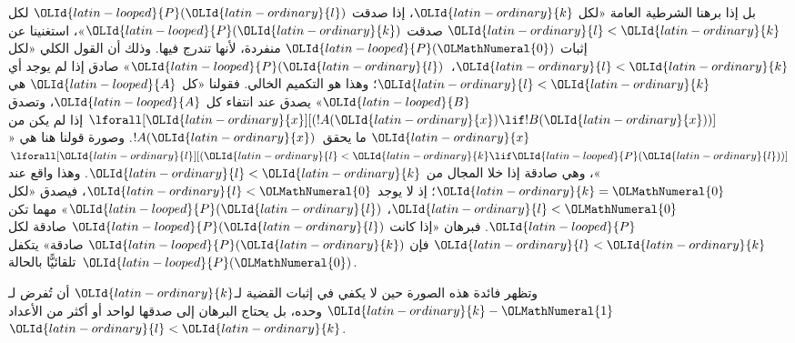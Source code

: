 \documentclass[../../../include/open-logic-section]{subfiles}
\begin{document}
بل إذا برهنا الشرطية العامة «لكل $\OLId{latin-ordinary}{k}$، إذا صدقت $\OLId{latin-looped}{P}(\OLId{latin-ordinary}{l})$ لكل $\OLId{latin-ordinary}{l}<\OLId{latin-ordinary}{k}$
صدقت $\OLId{latin-looped}{P}(\OLId{latin-ordinary}{k})$»، استغنينا عن إثبات $\OLId{latin-looped}{P}(\OLMathNumeral{0})$ منفردة، لأنها تندرج فيها.
وذلك أن القول الكلي «لكل $\OLId{latin-ordinary}{l}<\OLId{latin-ordinary}{k}$،~$\OLId{latin-looped}{P}(\OLId{latin-ordinary}{l})$» صادق إذا لم يوجد أي $\OLId{latin-ordinary}{l}<\OLId{latin-ordinary}{k}$؛
وهذا هو التكميم الخالي. فقولنا «كل $\OLId{latin-looped}{A}$ هي $\OLId{latin-looped}{B}$» يصدق عند انتفاء كل
$\OLId{latin-looped}{A}$، وتصدق $\lforall[\OLId{latin-ordinary}{x}][(!A(\OLId{latin-ordinary}{x}) \lif !B(\OLId{latin-ordinary}{x}))]$ إذا لم يكن من $\OLId{latin-ordinary}{x}$ ما
يحقق~$!A(\OLId{latin-ordinary}{x})$. وصورة قولنا هنا هي
«$\lforall[\OLId{latin-ordinary}{l}][(\OLId{latin-ordinary}{l} < \OLId{latin-ordinary}{k} \lif \OLId{latin-looped}{P}(\OLId{latin-ordinary}{l}))]$»، وهي صادقة إذا خلا المجال من
$\OLId{latin-ordinary}{l} < \OLId{latin-ordinary}{k}$. وهذا واقع عند $\OLId{latin-ordinary}{k}=\OLMathNumeral{0}$؛ إذ لا يوجد $\OLId{latin-ordinary}{l}<\OLMathNumeral{0}$، فيصدق «لكل $\OLId{latin-ordinary}{l}<\OLMathNumeral{0}$،
$\OLId{latin-looped}{P}(\OLId{latin-ordinary}{l})$» مهما تكن $\OLId{latin-looped}{P}$. فبرهان «إذا كانت $\OLId{latin-looped}{P}(\OLId{latin-ordinary}{l})$ صادقة لكل $\OLId{latin-ordinary}{l}<\OLId{latin-ordinary}{k}$ فإن
$\OLId{latin-looped}{P}(\OLId{latin-ordinary}{k})$ صادقة» يتكفل تلقائيًّا بالحالة~$\OLId{latin-looped}{P}(\OLMathNumeral{0})$.

وتظهر فائدة هذه الصورة حين لا يكفي في إثبات القضية لـ$\OLId{latin-ordinary}{k}$ أن تُفرض
لـ$\OLId{latin-ordinary}{k}-\OLMathNumeral{1}$ وحده، بل يحتاج البرهان إلى صدقها لواحد أو أكثر من الأعداد
$\OLId{latin-ordinary}{l}<\OLId{latin-ordinary}{k}$.
\end{document}
